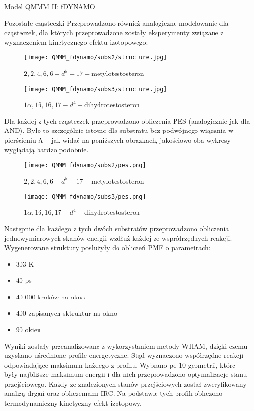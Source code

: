 \begin{section}{Model QMMM II: fDYNAMO}
\begin{subsection} { Pozostałe cząsteczki }
Przeprowadzono również analogiczne modelowanie dla cząsteczek, dla których przeprowadzone zostały eksperymenty związane z wyznaczeniem kinetycznego efektu izotopowego:

 \begin{figure}[H]
  \texttt{[image: QMMM\_fdynamo/subs2/structure.jpg]}
   \caption{$2,2,4,6,6-d^{5}-17-$metylotestosteron​}
\end{figure}

 \begin{figure}[H]
  \texttt{[image: QMMM\_fdynamo/subs3/structure.jpg]}
  \caption{ $1\alpha,16,16,17-d^{4}-$dihydrotestosteron }
\end{figure}
 
 Dla każdej z tych cząsteczek przeprowadzono obliczenia PES (analogicznie jak dla AND). Było to szczególnie istotne dla substratu bez podwójnego wiązania w pierścieniu A -- jak widać na poniższych obrazkach, 
 jakościowo oba wykresy wyglądają bardzo podobnie.
 
  \begin{figure}[H]
  \texttt{[image: QMMM\_fdynamo/subs2/pes.png]}
   \caption{$2,2,4,6,6-d^{5}-17-$metylotestosteron​}
\end{figure}

 \begin{figure}[H]
  \texttt{[image: QMMM\_fdynamo/subs3/pes.png]}
  \caption{ $1\alpha,16,16,17-d^{4}-$dihydrotestosteron }
\end{figure}
 
 Następnie dla każdego z tych dwóch substratów przeprowadzono obliczenia jednowymiarowych skanów energii wzdłuż każdej ze wsprółrzędnych reakcji. Wygenerowane struktury posłużyły do
 obliczeń PMF o parametrach:
 \begin{itemize}
 \item 303 K
 \item 40 ps 
 \item 40 000 kroków na okno
 \item 400 zapisanych sktruktur na okno
 \item 90 okien
\end{itemize}

Wyniki zostały przeanalizowane z wykorzystaniem metody WHAM, dzięki czemu uzyskano uśrednione profile energetyczne. Stąd wyznaczono współrzędne reakcji odpowiadające maksimum każdego z profilu.
Wybrano po 10 geometrii, które były najbliższe maksimum energii i dla nich przeprowadzono optymalizacje stanu przejściowego. Każdy ze znalezionych stanów przejściowych został zweryfikowany analizą
drgań oraz obliczeniami IRC. Na podstawie tych profili obliczono termodynamiczny kinetyczny efekt izotopowy.


\end{subsection}
\end{section}
